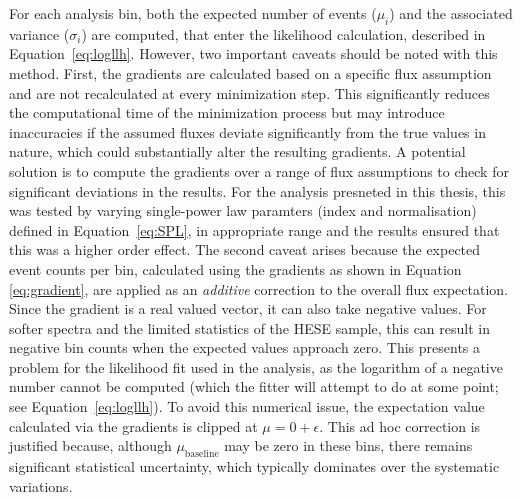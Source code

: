 For each analysis bin, both the expected number of events ($\mu_i$) and the associated variance ($\sigma_i$) are computed, that enter the likelihood calculation, described in Equation~\ref{eq:logllh}. However, two important caveats should be noted with this method. First, the gradients are calculated based on a specific flux assumption and are not recalculated at every minimization step. This significantly reduces the computational time of the minimization process but may introduce inaccuracies if the assumed fluxes deviate significantly from the true values in nature, which could substantially alter the resulting gradients. A potential solution is to compute the gradients over a range of flux assumptions to check for significant deviations in the results. For the analysis presneted in this thesis, this was tested by varying single-power law paramters (index and normalisation) defined in Equation~\ref{eq:SPL}, in appropriate range and the results ensured that this was a higher order effect. The second caveat arises because the expected event counts per bin, calculated using the gradients as shown in Equation \ref{eq:gradient}, are applied as an \emph{additive} correction to the overall flux expectation. Since the gradient is a real valued vector, it can also take negative values. For softer spectra and the limited statistics of the HESE sample, this can result in negative bin counts when the expected values approach zero. This presents a problem for the likelihood fit used in the analysis, as the logarithm of a negative number cannot be computed (which the fitter will attempt to do at some point; see Equation~\ref{eq:logllh}). To avoid this numerical issue, the expectation value calculated via the gradients is clipped at $\mu = 0 + \epsilon$. This ad hoc correction is justified because, although $\mu_{\mathrm{baseline}}$ may be zero in these bins, there remains significant statistical uncertainty, which typically dominates over the systematic variations.

